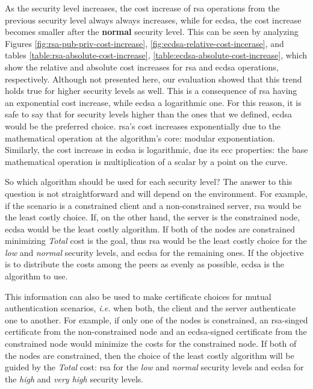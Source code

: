 As the security level increases, the cost increase of \gls{rsa} operations from the previous security level always always increases, 
while for \gls{ecdsa}, the cost increase becomes smaller after the \textbf{normal} security level.
This can be seen by analyzing Figures \ref{fig:rsa-pub-priv-cost-increase}, \ref{fig:ecdsa-relative-cost-incerase}, and 
tables \ref{table:rsa-absolute-cost-increase}, \ref{table:ecdsa-absolute-cost-increase}, which show the relative and absolute cost increases for 
\gls{rsa} and \gls{ecdsa} operations, respectively.
Although not presented here, our evaluation showed that this trend holds true
for higher security levels as well. This is a consequence of \gls{rsa} having an exponential cost increase, while \gls{ecdsa} a logarithmic one.
For this reason, it is safe to say that for security levels higher than the ones that we defined, \gls{ecdsa} would be the preferred choice.
\gls{rsa}'s cost increases exponentially due to the mathematical operation at the algorithm's core: modular exponentiation. Similarly, the cost
increase in \gls{ecdsa} is logarithmic, due its \gls{ecc} properties: the base mathematical operation is multiplication of a scalar by a point on the
curve.

So which algorithm should be used for each security level? The answer to this question is not straightforward and will depend on the environment.
For example, if the scenario is a constrained client and a non-constrained server, \gls{rsa} would be the least costly choice. If, on the
other hand, the server is the constrained node, \gls{ecdsa} would be the least costly algorithm. If both of the nodes are
constrained minimizing \textit{Total} cost is the goal, thus \gls{rsa} would be the least costly choice for the \textit{low} and 
\textit{normal} security levels, and \gls{ecdsa} for the remaining ones. If the objective is to distribute the costs among the peers as evenly as 
possible, \gls{ecdsa} is the algorithm to use.

This information can also be used to make
certificate choices for mutual authentication scenarios, \textit{i.e.} when both, the client and the server authenticate one to another.
For example, if only one of the nodes is constrained, an \gls{rsa}-singed certificate from the non-constrained node and an \gls{ecdsa}-signed
certificate from the constrained node would minimize the costs for the constrained node. If both of the nodes are constrained, then the
choice of the least costly algorithm will be guided by the \textit{Total} cost: \gls{rsa} for the \textit{low} and \textit{normal}
security levels and \gls{ecdsa} for the \textit{high} and \textit{very high} security levels.

